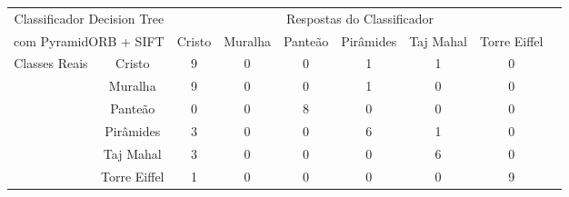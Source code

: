 \documentclass[a4paper,11pt]{article}
\begin{document}
\hspace{-75pt}
  \begin{tabular}{|cc|c|c|c|c|c|c|c|}
    \hline
    \multicolumn{2}{|c|}{Classificador Decision Tree} &
    \multicolumn{6}{|c|}{Respostas do Classificador} \\
    \cline{3-8}
    \multicolumn{2}{|c|}{com PyramidORB + SIFT}
    & Cristo & Muralha & Panteão & Pirâmides & Taj Mahal & Torre Eiffel \\
    \hline
    \multirow{6}{*}{Classes Reais}
    & \multicolumn{1}{|c|}{Cristo} & 9 & 0 & 0 & 1 & 1 & 0 \\
    \cline{2-8}
    & \multicolumn{1}{|c|}{Muralha} & 9 & 0 & 0 & 1 & 0 & 0\\
    \cline{2-8}
    & \multicolumn{1}{|c|}{Panteão} & 0 & 0 & 8 & 0 & 0 & 0\\
    \cline{2-8}
    & \multicolumn{1}{|c|}{Pirâmides} & 3 & 0 & 0 & 6 & 1 & 0\\
    \cline{2-8}
    & \multicolumn{1}{|c|}{Taj Mahal} & 3 & 0 & 0 & 0 & 6 & 0\\
    \cline{2-8}
    & \multicolumn{1}{|c|}{Torre Eiffel} & 1 & 0 & 0 & 0 & 0 & 9\\
    \hline
  \end{tabular}
\end{document}
